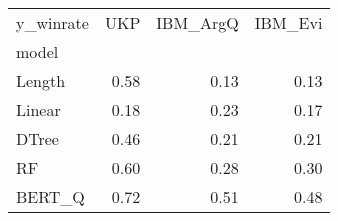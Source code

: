 \begin{tabular}{lrrr}
\toprule
y\_winrate &   UKP &  IBM\_ArgQ &  IBM\_Evi \\
model  &       &           &          \\
\midrule
Length &  0.58 &      0.13 &     0.13 \\
Linear &  0.18 &      0.23 &     0.17 \\
DTree  &  0.46 &      0.21 &     0.21 \\
RF     &  0.60 &      0.28 &     0.30 \\
BERT\_Q &  0.72 &      0.51 &     0.48 \\
\bottomrule
\end{tabular}
